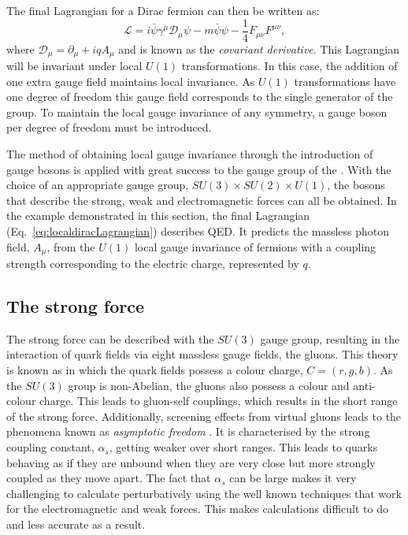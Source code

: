 The final Lagrangian for a Dirac fermion can then be written as:
\begin{equation}
  \label{eq:localdiracLagrangian}
  \mathcal{L}=i\bar{\psi}\gamma^{\mu}\mathcal{D}_{\mu}\psi-m\bar{\psi}\psi-\frac{1}{4}F_{\mu\nu}F^{\mu\nu},
\end{equation}
where $\mathcal{D}_{\mu}=\partial_{\mu}+iqA_{\mu}$ and is known as the
\emph{covariant derivative}. This Lagrangian will be invariant under
local $U(1)$ transformations. In this case, the addition of one extra
gauge field maintains local invariance. As $U(1)$ transformations have
one degree of freedom this gauge field corresponds to the single
generator of the group.  To maintain the local gauge invariance of
any symmetry, a gauge boson per degree of 
freedom must be introduced.

The method of obtaining local gauge invariance through the
introduction of gauge bosons is applied with great success to the
gauge group of the \SM. With the choice of an appropriate gauge group,
$SU(3)\times SU(2) \times U(1)$, the bosons that describe the strong,
weak and electromagnetic forces can all be obtained. In the example
demonstrated in this section, the final Lagrangian
(Eq.~\ref{eq:localdiracLagrangian}) describes \ac{QED}.
It predicts the massless photon field, $A_{\mu}$, from the $U(1)$
local gauge invariance of fermions with a coupling strength
corresponding to the electric charge, represented by $q$.

\subsection{The strong force}

The strong force can be described with the $SU(3)$ gauge group,
resulting in the interaction of quark fields
via eight massless gauge fields, the gluons. This theory is known as
\QCD in which
the quark fields possess a colour charge, $C=(r,g,b)$. As the
$SU(3)$ group is non-Abelian, the gluons also possess a colour and
anti-colour charge. This leads to gluon-self couplings, which
results in the short range of the strong force. Additionally,
screening effects from virtual gluons
leads to the phenomena known as \emph{asymptotic freedom}
\cite{PhysRevLett.30.1343}. It is characterised by the strong
coupling constant, $\alpha_s$, 
getting weaker over short ranges. This leads to quarks behaving as if
they are unbound when they are very close but more strongly coupled as
they move apart. The fact that $\alpha_s$ can be large makes it very
challenging to calculate \QCD perturbatively using the well known
techniques that work for the electromagnetic and weak forces.
This makes \QCD calculations difficult to do and less accurate as a
result.

